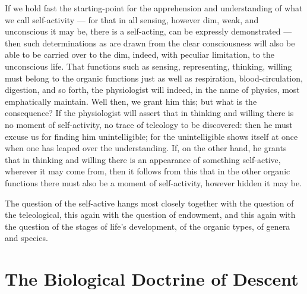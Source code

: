 \documentclass[12pt]{book}
\begin{document}
If we hold fast the starting-point for the apprehension and understanding of what we call
self-activity --- for that in all sensing, however dim, weak, and unconscious it may be, there
is a self-acting, can be expressly demonstrated --- then such determinations as are drawn from
the clear consciousness will also be able to be carried over to the dim, indeed, with peculiar
limitation, to the unconscious life. That functions such as sensing, representing, thinking,
willing must belong to the organic functions just as well as respiration, blood-circulation,
digestion, and so forth, the physiologist will indeed, in the name of physics, most
emphatically maintain. Well then, we grant him this; but what is the consequence? If the
physiologist will assert that in thinking and willing there is no moment of self-activity, no
trace of teleology to be discovered: then he must excuse us for finding him unintelligible; for
the unintelligible shows itself at once when one has leaped over the understanding. If, on the
other hand, he grants that in thinking and willing there is an appearance of something
self-active, wherever it may come from, then it follows from this that in the other organic
functions there must also be a moment of self-activity, however hidden it may be.

The question of the self-active hangs most closely together with the question of the
teleological, this again with the question of endowment, and this again with the question of
the stages of life's development, of the organic types, of genera and species.

\section{The Biological Doctrine of Descent}
\label{sec:19}
\end{document}
